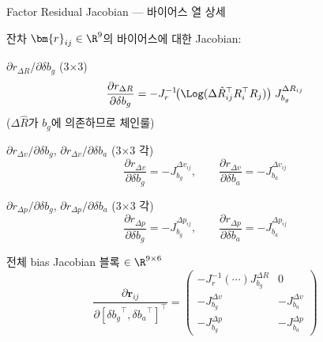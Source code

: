 \begin{frame}[shrink=10]{Factor Residual Jacobian — 바이어스 열 상세}

  잔차 $\bm{r}_{ij} \in \R^9$의 바이어스에 대한 Jacobian:

  \begin{block}{$\partial r_{\Delta R} / \partial \delta b_g$ (3$\times$3)}
    \[
      \frac{\partial r_{\Delta R}}{\partial \delta b_g}
      = -J_r^{-1}\!\bigl(\Log(\Delta\hat{R}_{ij}^\top R_i^\top R_j)\bigr)\;J_{b_g}^{\Delta R_{ij}}
    \]
    ($\Delta\hat{R}$가 $b_g$에 의존하므로 체인룰)
  \end{block}

  \pause
  \begin{block}{$\partial r_{\Delta v} / \partial \delta b_g$, $\partial r_{\Delta v} / \partial \delta b_a$ (3$\times$3 각)}
    \[
      \frac{\partial r_{\Delta v}}{\partial \delta b_g}
      = -J_{b_g}^{\Delta v_{ij}},
      \qquad
      \frac{\partial r_{\Delta v}}{\partial \delta b_a}
      = -J_{b_a}^{\Delta v_{ij}}
    \]
  \end{block}

  \pause
  \begin{block}{$\partial r_{\Delta p} / \partial \delta b_g$, $\partial r_{\Delta p} / \partial \delta b_a$ (3$\times$3 각)}
    \[
      \frac{\partial r_{\Delta p}}{\partial \delta b_g}
      = -J_{b_g}^{\Delta p_{ij}},
      \qquad
      \frac{\partial r_{\Delta p}}{\partial \delta b_a}
      = -J_{b_a}^{\Delta p_{ij}}
    \]
  \end{block}

  \pause
  \begin{exampleblock}{전체 bias Jacobian 블록 $\in \R^{9\times 6}$}
    \[
      \frac{\partial \bm{r}_{ij}}{\partial [{\delta b_g}^\top, {\delta b_a}^\top]^\top}
      =
      \begin{pmatrix}
        -J_r^{-1}(\cdots)J_{b_g}^{\Delta R} & 0 \\
        -J_{b_g}^{\Delta v} & -J_{b_a}^{\Delta v} \\
        -J_{b_g}^{\Delta p} & -J_{b_a}^{\Delta p}
      \end{pmatrix}
    \]
  \end{exampleblock}
\end{frame}

